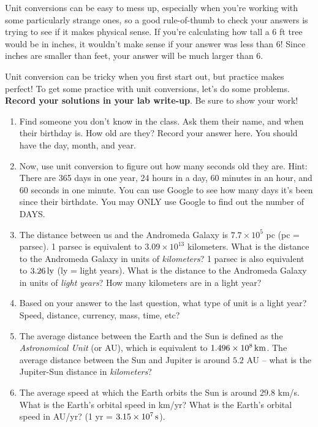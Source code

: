 \documentclass[11pt]{article}
\begin{document}
Unit conversions can be easy to mess up, especially when you're working with some particularly strange ones, so a good rule-of-thumb to check your answers is trying to see if it makes physical sense. If you're calculating how tall a 6 ft tree would be in inches, it wouldn't make sense if your answer was less than 6! Since inches are smaller than feet, your answer will be much larger than 6.

Unit conversion can be tricky when you first start out, but practice makes perfect! To get some practice with unit conversions, let's do some problems. \textbf{Record your solutions in your lab write-up}. Be sure to show your work!
\begin{enumerate}
    \item Find someone you don't know in the class. Ask them their name, and when their birthday is. How old are they? Record your answer here. You should have the day, month, and year.

    \item Now, use unit conversion to figure out how many seconds old they are. Hint: There are 365 days in one year, 24 hours in a day, 60 minutes in an hour, and 60 seconds in one minute. You can use Google to see how many days it's been since their birthdate. You may ONLY use Google to find out the number of DAYS. 
    
    \item The distance between us and the Andromeda Galaxy is $7.7 \times 10^5$ pc (pc = parsec). 1 parsec is equivalent to $3.09 \times 10^{13}$ kilometers. What is the distance to the Andromeda Galaxy in units of \emph{kilometers}? 1 parsec is also equivalent to $3.26 \, {\rm ly}$ (ly = light years). What is the distance to the Andromeda Galaxy in units of \emph{light years}? How many kilometers are in a light year? 

    \item Based on your answer to the last question, what type of unit is a light year? Speed, distance, currency, mass, time, etc?
    
    \item The average distance between the Earth and the Sun is defined as the \emph{Astronomical Unit} (or AU), which is equivalent to $1.496 \times 10^8 \, {\rm km}$. The average distance between the Sun and Jupiter is around $5.2$ AU -- what is the Jupiter-Sun distance in \emph{kilometers}?   
    
    \item The average speed at which the Earth orbits the Sun is around 29.8 km/s. What is the Earth's orbital speed in km/yr? What is the Earth's orbital speed in AU/yr? (1 yr = $3.15 \times 10^7 \, {\rm s}$).
\end{enumerate}
\bigskip
\end{document}
